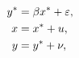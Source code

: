 \begin{equation*} \label{eq:uME}
	\begin{aligned}
		y^{*} &= \beta x^{*} + \varepsilon, \\
		x &= x^{*} + u, \\
		y &= y^{*} + \nu,
	\end{aligned}
\end{equation*}